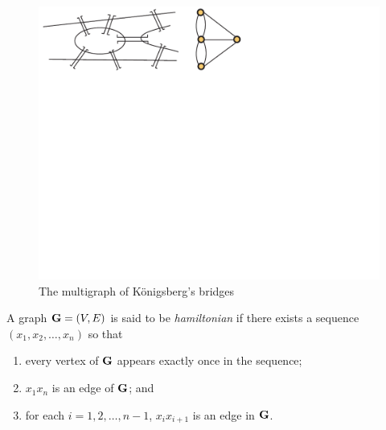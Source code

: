 \begin{figure}[h]
  \centering
  \includegraphics[clip,viewport=228 306 298 400]{graphs-figs/konigsberg}
  \caption{The multigraph of K\"onigsberg's bridges}
  \label{fig:bridges-graph}
\end{figure}

A graph $\mathbf{G}=(V,E)$ is said to be \textit{hamiltonian} if there exists a
sequence $(x_1,x_2,\dots,x_n)$ so that
\begin{enumerate}
\item every vertex of $\mathbf{G}$ appears exactly once in the sequence;
\item $x_1x_n$ is an edge of $\mathbf{G}$; and
\item for each $i=1,2,\dots,n-1$, $x_ix_{i+1}$ is an edge in $\mathbf{G}$.
\end{enumerate}

